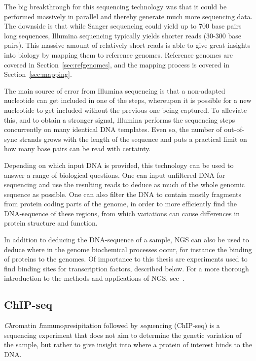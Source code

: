 The big breakthrough for this sequencing technology was that it could be performed massively in parallel and thereby generate much more sequencing data.
The downside is that while Sanger sequencing could yield up to 700 base pairs long sequences, Illumina sequencing typically yields shorter reads (30-300 base pairs).
This massive amount of relatively short reads is able to give great insights into biology by mapping them to reference genomes.
Reference genomes are covered in Section~\ref{sec:refgenomes}, and the mapping process is covered in Section~\ref{sec:mapping}.

The main source of error from Illumina sequencing is that a non-adapted nucleotide can get included in one of the steps, whereupon it is possible for a new nucleotide to get included without the previous one being captured.
To alleviate this, and to obtain a stronger signal, Illumina performs the sequencing steps concurrently on many identical DNA templates. Even so, the number of out-of-sync strands grows with the length of the sequence and puts a practical limit on how many base pairs can be read with certainty.

Depending on which input DNA is provided, this technology can be used to answer a range of biological questions.
One can input unfiltered DNA for sequencing and use the resulting reads to deduce as much of the whole genomic sequence as possible. One can also filter the DNA to contain mostly fragments from protein coding parts of the genome, in order to more efficiently find the DNA-sequence of these regions, from which variations can cause differences in protein structure and function.

In addition to deducing the DNA-sequence of a sample, NGS can also be used to deduce where in the genome biochemical processes occur, for instance the binding of proteins to the genomes. Of importance to this thesis are experiments used to find binding sites for transcription factors, described below. For a more thorough introduction to the methods and applications of NGS, see~\cite{ngs}.

\subsection{ChIP-seq}
\emph{Ch}romatin \emph{I}mmuno\emph{p}resipitation  followed by \emph{seq}uencing (ChIP-seq) is a sequencing experiment that does not aim to determine the genetic variation of the sample, but rather to give insight into where a protein of interest binds to the DNA.

